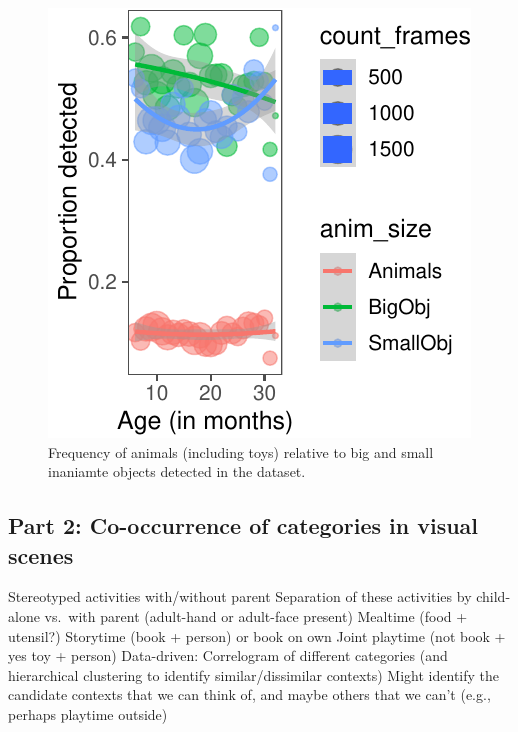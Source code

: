 \documentclass[10pt, letterpaper]{article}
\newenvironment{CodeChunk}{}{}
\begin{document}
\begin{CodeChunk}
\begin{figure}[h]

{\centering \includegraphics{figs/anim_size-1} 

}

\caption[Frequency of animals (including toys) relative to big and small inaniamte objects detected in the dataset]{Frequency of animals (including toys) relative to big and small inaniamte objects detected in the dataset.}\label{fig:anim_size}
\end{figure}
\end{CodeChunk}

\subsection{Part 2: Co-occurrence of categories in visual
scenes}\label{part-2-co-occurrence-of-categories-in-visual-scenes}

Stereotyped activities with/without parent Separation of these
activities by child-alone vs.~with parent (adult-hand or adult-face
present) Mealtime (food + utensil?) Storytime (book + person) or book on
own Joint playtime (not book + yes toy + person) Data-driven:
Correlogram of different categories (and hierarchical clustering to
identify similar/dissimilar contexts) Might identify the candidate
contexts that we can think of, and maybe others that we can't (e.g.,
perhaps playtime outside)
\end{document}
